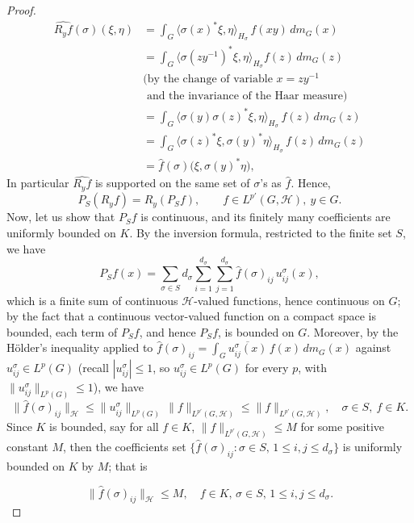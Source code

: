 \documentclass[11pt]{amsart}
\begin{document}
\begin{proof}
\begin{align*}
\widehat{R_yf}(\sigma)(\xi,\eta)&=\int_G\langle\sigma(x)^*\xi,\eta\rangle_{H_\sigma}\,
f(xy)\,dm_G(x)\\
&=\int_G\langle\sigma(zy^{-1})^*\xi,\eta\rangle_{H_\sigma}f(z)\,dm_G(z)\\ 
&\text{(by the change of variable }   x=zy^{-1} \\
&\text{ and the invariance of the Haar measure})\\
&=\int_G\langle\sigma(y)\sigma(z)^*\xi,\eta\rangle_{H_\sigma}\,f(z)\,dm_G(z)\\
&=\int_G\langle\sigma(z)^*\xi,\sigma(y)^*\eta\rangle_{H_\sigma}\,f(z)\,dm_G(z)\\
&=\hat f(\sigma)\big(\xi,\sigma(y)^*\eta\big),
\end{align*}
 In particular $\widehat{R_yf}$ is
supported on the same set of $\sigma$'s as $\widehat f$.
Hence,
$$
P_S(R_yf)=R_y(P_Sf),\qquad f\in L^{p'}(G,\mathcal{H}),\ y\in G. 
$$
Now, let us show that $P_Sf$ is continuous, and its finitely many coefficients are uniformly
bounded on $K$. By the inversion formula, restricted to the finite set $S$, we have
$$
P_Sf(x)=\sum_{\sigma\in S}d_\sigma\sum_{i=1}^{d_\sigma}\sum_{j=1}^{d_\sigma}\widehat f(\sigma)_{ij}\,
u^\sigma_{ij}(x),
$$
which is a finite sum of continuous $\mathcal{H}$-valued functions, hence continuous on $G$; by
the fact that a continuous vector-valued function on a compact space is bounded, each term of $P_Sf$, and hence $P_Sf$, is
bounded on $G$. Moreover, by  the H\"older's inequality applied to
$\widehat f(\sigma)_{ij}=\displaystyle\int_G\overline{u^\sigma_{ij}(x)}\,f(x)\,dm_G(x)$ against
$u^\sigma_{ij}\in L^p(G)$ (recall $|u^\sigma_{ij}|\le1$, so $u^\sigma_{ij}\in
L^p(G)$ for every $p$, with $\|u^\sigma_{ij}\|_{L^p(G)}\le1$), we have 
$$
\|\widehat f(\sigma)_{ij}\|_\mathcal{H}\le\|u^\sigma_{ij}\|_{L^p(G)}\,\|f\|_{L^{p'}(G,\mathcal{H})}\le
\|f\|_{L^{p'}(G,\mathcal{H})},\quad\sigma\in S,\ f\in K.
$$
Since $K$ is bounded, say for all $f\in K$, $\|f\|_{L^{p'}(G,\mathcal{H})}\le M$ for some positive constant $M$,  then the coefficients set 
 $\{\widehat f(\sigma)_{ij}:\sigma\in S,\,1\le i,j\le
d_\sigma\}$ is uniformly bounded on $K$ by $M$; that is 

\begin{equation}\label{CoeffBound}
\|\widehat f(\sigma)_{ij}\|_\mathcal{H}\le M,\quad f\in K,\, \sigma\in S,\,1\le i,j\le
d_\sigma.
\end{equation}


\end{proof}
\end{document}
